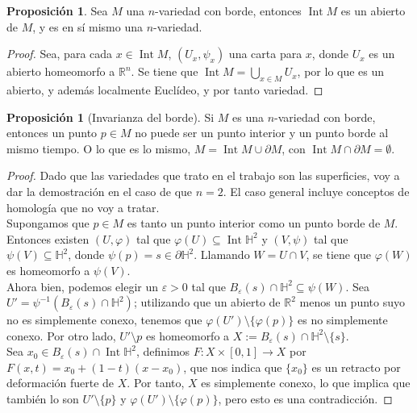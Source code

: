 \documentclass[10pt]{report}
\newcommand{\R}{\mathbb{R}}
\DeclareMathOperator{\interior}{Int} %
\theoremstyle{definition}
\newtheorem{prop}[defin]{Proposición}
\begin{document}
\begin{prop}\label{prop:int_variedad}%
Sea $M$ una $n$-variedad con borde, entonces $\interior{M}$ es un abierto de $M$, y es en sí mismo una $n$-variedad.
\end{prop}
\begin{proof}
Sea, para cada $x\in \interior{M}$, $(U_x,\psi_x)$ una carta para $x$, donde $U_x$ es un abierto homeomorfo a $\R^n$. Se tiene que $\interior{M}=\bigcup_{x\in M} U_x$, por lo que es un abierto, y además localmente Euclídeo, y por tanto variedad.
\end{proof}
\begin{prop}[Invarianza del borde]%
Si $M$ es una $n$-variedad con borde, entonces un punto $p\in M$ no puede ser un punto interior y un punto borde al mismo tiempo. O lo que es lo mismo, $M=\interior{M} \cup \partial M$, con $\interior{M} \cap \partial M=\emptyset$.
\end{prop}
\begin{proof}
Dado que las variedades que trato en el trabajo son las superficies, voy a dar la demostración en el caso de que $n=2$. El caso general incluye conceptos de homología que no voy a tratar.\\
Supongamos que $p\in M$ es tanto un punto interior como un punto borde de $M$. Entonces existen $(U,\varphi)$ tal que $\varphi (U)\subseteq \interior{\mathbb{H}^2}$ y $(V,\psi)$ tal que $\psi (V)\subseteq \mathbb{H}^2$, donde $\psi (p)=s\in \partial \mathbb{H}^2$. Llamando $W=U\cap V$, se tiene que $\varphi (W)$ es homeomorfo a $\psi (V)$. \\
Ahora bien, podemos elegir un $\varepsilon >0$ tal que $B_{\varepsilon}(s)\cap \mathbb{H}^2 \subseteq \psi (W)$. Sea $U'=\psi^{-1}\left( B_{\varepsilon}(s) \cap \mathbb{H}^2\right)$; utilizando que un abierto de $\R^2$ menos un punto suyo no es simplemente conexo, tenemos que $\varphi (U')\setminus \{\varphi (p) \}$ es no simplemente conexo. Por otro lado, $U'\setminus {p}$ es homeomorfo a $X:=B_{\varepsilon}(s)\cap \mathbb{H}^2 \setminus \{ s\}$.\\
Sea $x_0\in B_{\varepsilon}(s)\cap \interior{\mathbb{H}^2}$, definimos $F: X\times \left[ 0,1\right] \to X$ por $F(x,t)=x_0 + (1-t)(x-x_0)$, que nos indica que $\{x_0\}$ es un retracto por deformación fuerte de $X$. Por tanto, $X$ es simplemente conexo, lo que implica que también lo son $U'\setminus \{p\}$ y $\varphi(U')\setminus \{ \varphi (p)\}$, pero esto es una contradicción.
\end{proof}
\end{document}
